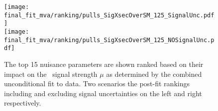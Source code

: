 \begin{figure}[ht]
  \centering
  \texttt{[image: final\_fit\_mva/ranking/pulls\_SigXsecOverSM\_125\_SignalUnc.pdf]}
  \\
  \texttt{[image: final\_fit\_mva/ranking/pulls\_SigXsecOverSM\_125\_NOSignalUnc.pdf]}
  \caption{The top 15 nuisance parameters are shown ranked based on their impact
  on the \VHbb\ signal strength $\mu$ as determined by the combined
  unconditional fit to data. Two scenarios the post-fit rankings including and
  excluding signal uncertainties on the left and right respectively.}
  \label{fig:Rank_012L_MVAVH}
\end{figure}